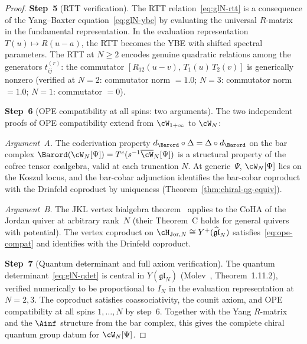 \begin{proof}
\medskip
\noindent
\textbf{Step~5}
(RTT verification).
The RTT relation~\eqref{eq:glN-rtt} is a consequence of
the Yang--Baxter equation~\eqref{eq:glN-ybe} by
evaluating the universal $R$-matrix in the
fundamental representation. In the evaluation
representation $T(u) \mapsto R(u - a)$, the RTT becomes
the YBE with shifted spectral parameters.
The RTT at
$N \geq 2$ encodes genuine quadratic relations among the
generators $t_{ij}^{(r)}$: the commutator
$[R_{12}(u-v),\, T_1(u)\, T_2(v)]$ is generically nonzero
(verified at $N = 2$: commutator norm $= 1.0$;
$N = 3$: commutator norm $= 1.0$;
$N = 1$: commutator $= 0$).

\medskip
\noindent
\textbf{Step~6}
(OPE compatibility at all spins: two arguments).
The two independent proofs of OPE compatibility extend
from $\cW_{1+\infty}$ to $\cW_N$:

\smallskip
\noindent\emph{Argument~A.}
The coderivation property
$d_{\Barord} \circ \Delta = \Delta \circ d_{\Barord}$
on the bar complex $\Barord(\cW_N[\Psi])
= T^c(s^{-1}\overline{\cW}_N[\Psi])$
is a structural property of the cofree tensor coalgebra,
valid at each truncation $N$. At generic~$\Psi$,
$\cW_N[\Psi]$ lies on the Koszul locus, and the
bar-cobar adjunction identifies the bar-cobar coproduct
with the Drinfeld coproduct by uniqueness
(Theorem~\ref{thm:chiral-qg-equiv}).

\smallskip
\noindent\emph{Argument~B.}
The JKL vertex bialgebra theorem~\cite{JKL26} applies to
the CoHA of the Jordan quiver at arbitrary rank~$N$
(their Theorem~C holds for general quivers with
potential). The vertex coproduct on
$\cH_{\mathrm{Jor},N}
\cong Y^+(\widehat{\mathfrak{gl}}_N)$
satisfies~\eqref{eq:ope-compat} and identifies with
the Drinfeld coproduct.

\medskip
\noindent
\textbf{Step~7}
(Quantum determinant and full axiom verification).
The quantum determinant~\eqref{eq:glN-qdet} is central
in $Y(\mathfrak{gl}_N)$
(Molev~\cite{Molev07}, Theorem~1.11.2),
verified numerically to be proportional to
$I_N$ in the evaluation representation at $N = 2, 3$.
The coproduct satisfies coassociativity, the counit axiom,
and OPE compatibility at all spins $1, \ldots, N$ by
step~6. Together with
the Yang $R$-matrix and the $\Ainf$ structure from the bar
complex, this gives the complete chiral quantum group
datum for $\cW_N[\Psi]$.
\end{proof}

